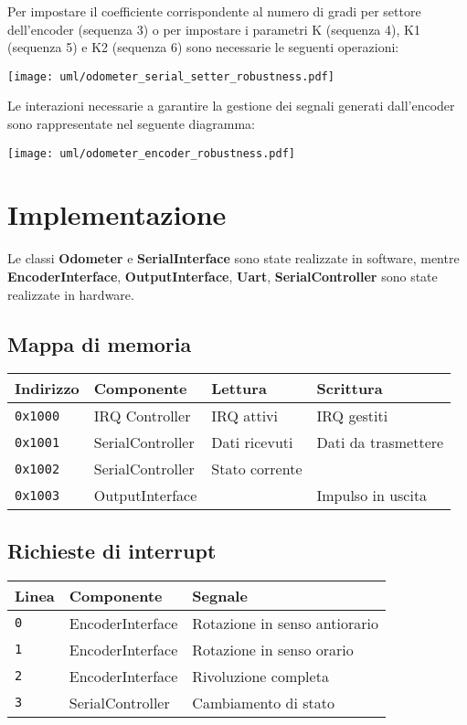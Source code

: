 \documentclass [11pt,a4paper,oneside]{paper}
\newcommand{\component}[1]{\textbf{#1}}
\newcommand{\inputC}[1]{}
\begin{document}
Per impostare il coefficiente corrispondente al numero di gradi per settore
dell'encoder (sequenza 3) o per impostare i parametri K (sequenza 4), K1
(sequenza 5) e K2 (sequenza 6) sono necessarie le seguenti operazioni:
\begin{center}
    \texttt{[image: uml/odometer\_serial\_setter\_robustness.pdf]}
    \label{serial_getter_robustness}
\end{center}

Le interazioni necessarie a garantire la gestione dei segnali
generati dall'encoder sono rappresentate nel seguente diagramma:

\begin{center}
    \texttt{[image: uml/odometer\_encoder\_robustness.pdf]}
    \label{encoder_robustness}
\end{center}


\section{Implementazione}

Le classi \component{Odometer} e \component{SerialInterface} sono state
realizzate in software, mentre \component{EncoderInterface}, 
\component{OutputInterface}, \component{Uart}, \component{SerialController}
sono state realizzate in hardware.

\subsection{Mappa di memoria}
\begin{tabular}{|l|l|l|l|}
\hline
Indirizzo & Componente & Lettura & Scrittura \\
\hline
\texttt{0x1000} & IRQ Controller & IRQ attivi & IRQ gestiti \\
\hline
\texttt{0x1001} & SerialController & Dati ricevuti & Dati da trasmettere \\
\hline
\texttt{0x1002} & SerialController & Stato corrente & \\
\hline
\texttt{0x1003} & OutputInterface & & Impulso in uscita \\
\hline
\end{tabular}

\inputC{software/memory_map.h}

\subsection{Richieste di interrupt}
\begin{tabular}{|l|l|l|}
\hline
Linea & Componente & Segnale \\
\hline
\texttt{0} & EncoderInterface & Rotazione in senso antiorario \\
\hline
\texttt{1} & EncoderInterface & Rotazione in senso orario \\
\hline
\texttt{2} & EncoderInterface & Rivoluzione completa \\
\hline
\texttt{3} & SerialController & Cambiamento di stato \\
\hline
\end{tabular}
\end{document}
